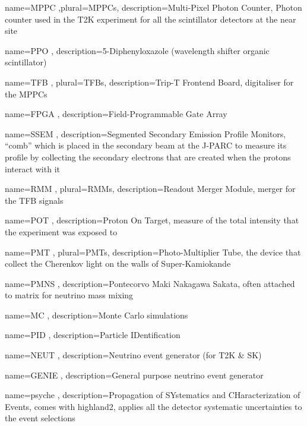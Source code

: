  {name=MPPC ,plural=MPPCs,
description={Multi-Pixel Photon Counter, Photon counter used in the
T2K experiment for all the scintillator detectors at the near site}}

 {name=PPO , description={5-Diphenyloxazole
(wavelength shifter organic scintillator)}}


 {name=TFB , plural=TFBs, description={Trip-T
Frontend Board, digitaliser for the MPPCs}}

 {name=FPGA , description={Field-Programmable
Gate Array}}

 {name=SSEM , description={Segmented Secondary
Emission Profile Monitors, ``comb'' which is placed in the secondary
beam at the J-PARC to measure its profile by collecting the secondary
electrons that are created when the protons interact with it}}

 {name=RMM , plural=RMMs, description={Readout
Merger Module, merger for the TFB signals}}

 {name=POT , description={Proton On Target,
measure of the total intensity that the experiment was exposed to}}

 {name=PMT , plural=PMTs,
description={Photo-Multiplier Tube, the device that collect the
Cherenkov light on the walls of Super-Kamiokande}}

 {name=PMNS , description={Pontecorvo Maki
Nakagawa Sakata, often attached to matrix for neutrino mass mixing}}

 {name=MC , description={Monte Carlo
simulations}}

 {name=PID , description={Particle
IDentification}}

 {name=NEUT , description={Neutrino event
generator (for T2K \& SK)}}

 {name=GENIE , description={General purpose
neutrino event generator}}


 {name=psyche , description={Propagation of
SYstematics and CHaracterization of Events, comes with highland2,
applies all the detector systematic uncertainties to the event
selections}}

